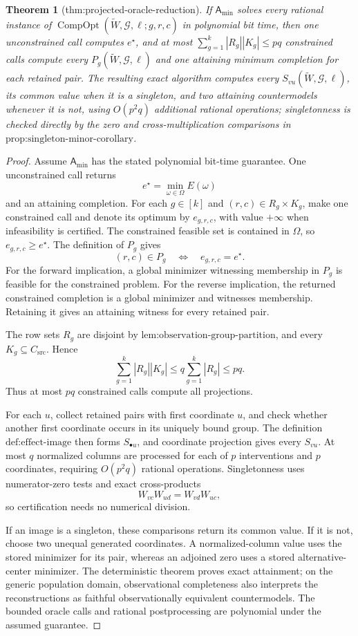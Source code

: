 \documentclass{article}
\newtheorem{theorem}{Theorem}
\begin{document}
\begin{theorem}[thm:projected-oracle-reduction]\label{thm:projected-oracle-reduction}
If \(\mathsf A_{\min}\) solves every rational instance of \(\operatorname{CompOpt}(\widetilde W,\mathcal G,\ell;g,r,c)\) in polynomial bit time, then one unconstrained call computes \(e^{\star}\), and at most \(\sum_{g=1}^{k}|R_g||K_g|\leq pq\) constrained calls compute every \(P_g(\widetilde W,\mathcal G,\ell)\) and one attaining minimum completion for each retained pair. The resulting exact algorithm computes every \(S_{vu}(\widetilde W,\mathcal G,\ell)\), its common value when it is a singleton, and two attaining countermodels whenever it is not, using \(O(p^2q)\) additional rational operations; singletonness is checked directly by the zero and cross-multiplication comparisons in \(\text{prop:singleton-minor-corollary}\).
\end{theorem}
\begin{proof}
Assume \(\mathsf A_{\min}\) has the stated polynomial bit-time guarantee. One unconstrained call returns
\[
e^\star=\min_{\omega\in\Omega}E(\omega)
\]
and an attaining completion. For each \(g\in[k]\) and \((r,c)\in R_g\times K_g\), make one constrained call and denote its optimum by \(e_{g,r,c}\), with value \(+\infty\) when infeasibility is certified. The constrained feasible set is contained in \(\Omega\), so \(e_{g,r,c}\ge e^\star\). The definition of \(P_g\) gives
\[
(r,c)\in P_g\quad\Longleftrightarrow\quad e_{g,r,c}=e^\star.
\]
For the forward implication, a global minimizer witnessing membership in \(P_g\) is feasible for the constrained problem. For the reverse implication, the returned constrained completion is a global minimizer and witnesses membership. Retaining it gives an attaining witness for every retained pair.

The row sets \(R_g\) are disjoint by \(\text{lem:observation-group-partition}\), and every \(K_g\subseteq C_{\mathrm{src}}\). Hence
\[
\sum_{g=1}^{k}|R_g||K_g|\le q\sum_{g=1}^{k}|R_g|\le pq.
\]
Thus at most \(pq\) constrained calls compute all projections.

For each \(u\), collect retained pairs with first coordinate \(u\), and check whether another first coordinate occurs in its uniquely bound group. The definition \(\text{def:effect-image}\) then forms \(S_{\bullet u}\), and coordinate projection gives every \(S_{vu}\). At most \(q\) normalized columns are processed for each of \(p\) interventions and \(p\) coordinates, requiring \(O(p^2q)\) rational operations. Singletonness uses numerator-zero tests and exact cross-products
\[
W_{vc}W_{ud}=W_{vd}W_{uc},
\]
so certification needs no numerical division.

If an image is a singleton, these comparisons return its common value. If it is not, choose two unequal generated coordinates. A normalized-column value uses the stored minimizer for its pair, whereas an adjoined zero uses a stored alternative-center minimizer. The deterministic theorem proves exact attainment; on the generic population domain, observational completeness also interprets the reconstructions as faithful observationally equivalent countermodels. The bounded oracle calls and rational postprocessing are polynomial under the assumed guarantee.
\end{proof}
\end{document}
